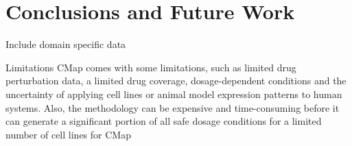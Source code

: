 \documentclass[bsc,frontabs,twoside,singlespacing,parskip,deptreport]{infthesis}     %
\begin{document}
\chapter{Conclusions and Future Work}

Include domain specific data

Limitations
CMap comes with some limitations, such as limited drug perturbation data, a limited drug coverage, dosage-dependent conditions and the uncertainty of applying cell lines or animal model expression patterns to human systems. Also, the methodology can be expensive and time-consuming before it can generate a significant portion of all safe dosage conditions for a limited number of cell lines for CMap



\end{document}
